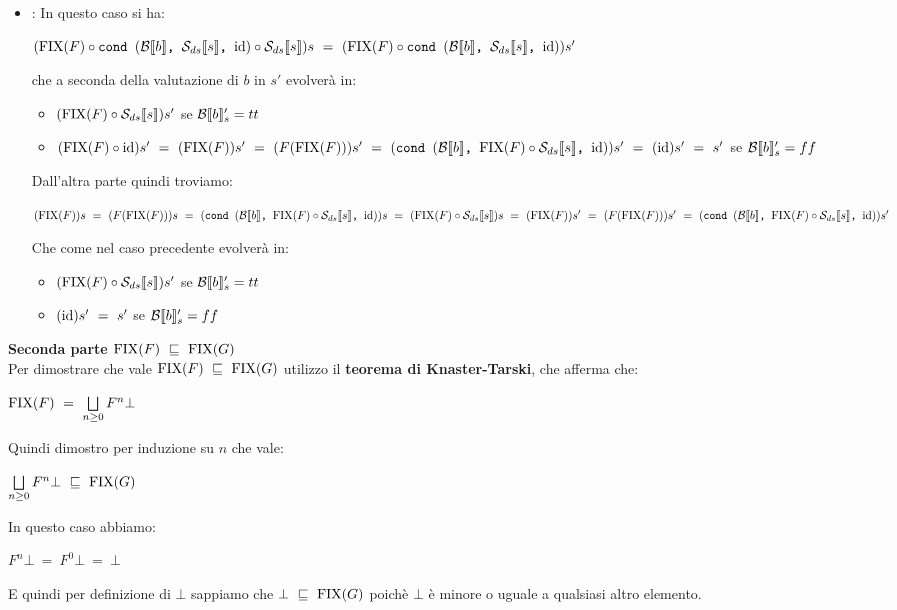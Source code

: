 {\begin{itemize}
\begin{itemize}
			\item {}: In questo caso si ha:
			\begin{center}
			$(\fixp{F} \circ \cond{b}{\Sds{}}{\idDS} \circ{} \Sds{})s~=~
			(\fixp{F} \circ \cond{b}{\Sds{}}{\idDS})s'$
			\end{center}
			che a seconda della valutazione di $b$ in $s'$ evolverà in:
			\begin{itemize}
			\item $(\fixp{F} \circ \Sds{})s'$ se $\evalBbs{b}{s'}=tt$
			\item $(\fixp{F} \circ \idDS)s'~=~(\fixp{F})s'~=~(F(\fixp{F}))s'~=~(\cond{b}{\fixp{F} \circ{} \Sds{}}{\idDS})s'~=~(\idDS{})s'~=~s'$ se $\evalBbs{b}{s'}=ff$
			\end{itemize}
			Dall'altra parte quindi troviamo:
			\begin{center}
			$(\fixp{F})s~=~(F(\fixp{F}))s~=~(\cond{b}{\fixp{F} \circ{} \Sds{}}{\idDS})s~=~(\fixp{F} \circ{} \Sds{})s~=~(\fixp{F})s'~=~(F(\fixp{F}))s'~=~(\cond{b}{\fixp{F} \circ{} \Sds{}}{\idDS})s'$
			\end{center}
			Che come nel caso precedente evolverà in:
			\begin{itemize}
			\item $(\fixp{F} \circ \Sds{})s'$ se $\evalBbs{b}{s'}=tt$
			\item $(\idDS{})s'~=~s'$ se $\evalBbs{b}{s'}=ff$
			\end{itemize}
		\end{itemize}
	\end{itemize}

	\textbf{Seconda parte $\fixp{F}~\mineq~\fixp{G}$}\\
	Per dimostrare che vale $\fixp{F}~\mineq~\fixp{G}$ utilizzo il
	\textbf{teorema di Knaster-Tarski}, che afferma che:
	\begin{center}
	$\fixp{F}~=~\unionsem{n}F^{n}\bot$
	\end{center}
	Quindi dimostro per induzione su $n$ che vale:
	\begin{center}
	$\unionsem{n}F^{n}\bot~\mineq~\fixp{G}$
	\end{center}

	 In questo caso abbiamo:
	\begin{center}
	$F^{n}\bot~=~F^{0}\bot~=~\bot$
	\end{center}
	E quindi per definizione di $\bot$ sappiamo che $\bot~\mineq~\fixp{G}$
	poichè $\bot$ è minore o uguale a qualsiasi altro elemento.

}
